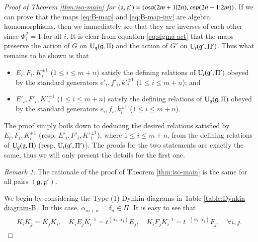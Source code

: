 \documentclass[12pt]{amsart}
\theoremstyle{definition}
\theoremstyle{remark}
\newtheorem{remark}[theorem]{Remark}
\numberwithin{equation}{section}
\begin{document}
\begin{proof}[Proof of Theorem \ref{thm:iso-main} for $({{\mathfrak g}}, {{\mathfrak g}}')=({{\rm\mathfrak{osp}}}(2m+1|2n), {{\rm\mathfrak{osp}}}(2n+1|2m))$]
If we can prove that the maps \eqref{eq:B-map} and \eqref{eq:B-map-inv} are algebra homomorphisms,
then we immediately see that they are inverses of each other since $\Phi^2_i=1$ for all $i$. 
It is clear from equation \eqref{eq:sigma-act} that the maps preserve the action of $G$ on ${{\rm{U}_q}}({{\mathfrak g}}, \Pi)$ and the action of $G'$ on ${{\rm U}}_{t}({{\mathfrak g}}', \Pi')$.  Thus what remains to be shown is that
\begin{itemize}
\item $E_i, F_i, K^{\pm 1}_i$ ($1\le i\le m+n$)
satisfy the defining relations of ${{\rm U}}_{t}({{\mathfrak g}}', \Pi')$
obeyed by the standard generators $e'_i, f'_i, {k'}_i^{\pm 1}$ ($1\le i\le m+n$);
and
\item
$E'_i, F'_i, {K'}^{\pm 1}_i$ ($1\le i\le m+n$) satisfy the defining relations of ${{\rm U}}_q({{\mathfrak g}}, \Pi)$ obeyed by the standard generators $e_i, f_i, k_i^{\pm 1}$ ($1\le i\le m+n$).
\end{itemize}
The proof simply boils down to deducing the desired relations satisfied
by $E_i, F_i, K^{\pm 1}_i$ (resp.  $E'_i, F'_i, {K'}^{\pm 1}_i$), where $1\le i\le m+n$,
from the defining relations of  ${{\rm U}}_q({{\mathfrak g}}, \Pi)$ (resp. ${{\rm U}}_t({{\mathfrak g}}', \Pi')$).
The proofs for the two statements are exactly the same, thus
we will only present the details for the first one.

\begin{remark} \label{rem:rationale} The rationale of the proof of
Theorem \ref{thm:iso-main} is the same for all pairs $({{\mathfrak g}}, {{\mathfrak g}}')$.
\end{remark}

We begin by considering the Type (1) Dynkin diagrams in Table \ref{table:Dynkin diagram-B}.
In this case, $\alpha_{m+n}=\delta_{n}\in \Pi$. It is easy to see that
\begin{eqnarray}\label{eq:KK-t}
\begin{aligned}
K_i K_j=K_j K_i, \quad
K_iE_jK_i^{-1}=t^{(\alpha_i,\alpha_j)}E_j, \quad
K_iF_jK_i^{-1}=t^{-(\alpha_i,\alpha_j)}F_j, \quad \forall i, j.
\end{aligned}
\end{eqnarray}


\end{proof}
\end{document}
